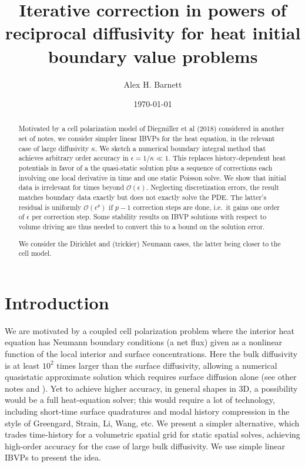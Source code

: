 \documentclass[10pt]{article}
\newcommand{\bigO}{{\mathcal O}}
\newcommand{\eps}{\epsilon}
\begin{document}
\title{Iterative correction in powers of reciprocal diffusivity for heat initial boundary value problems}

\author{Alex H. Barnett}
\date{\today}
\maketitle

\begin{abstract}
  Motivated by a cell polarization model of Diegmiller et al (2018)
  considered in another set of notes,
  we consider simpler linear IBVPs for the heat equation,
  in the relevant case of large diffusivity $\kappa$.
  We sketch a numerical boundary integral method that achieves
  arbitrary order accuracy in $\eps = 1/\kappa \ll 1$.
  This replaces history-dependent heat potentials in favor of a
  the quasi-static solution plus a sequence of corrections each involving
  one local derivative in time and one static Poisson solve.
  We show that initial data is irrelevant for times beyond $\bigO(\eps)$.
  Neglecting discretization errors, the 
  result matches boundary data exactly but does not exactly solve the PDE.
  The latter's residual is uniformly $\bigO(\eps^p)$
  if $p-1$ correction steps are done, i.e.\ it gains one order of $\eps$
  per correction step.
  Some stability results on IBVP solutions with respect to volume driving
  are thus needed to convert this to a bound on the solution error.

  We consider the Dirichlet and (trickier) Neumann cases,
  the latter being closer to the cell model.
\end{abstract}

\section{Introduction}

We are motivated by a coupled cell polarization problem \cite{diegmiller18}
where the interior heat equation has Neumann boundary conditions
(a net flux) given as a nonlinear function of the local interior and surface concentrations.
Here the bulk diffusivity is at least $10^2$ times larger than the surface diffusivity, allowing a
numerical quasistatic approximate solution which
requires surface diffusion alone (see other notes and \cite{diegmiller18}).
Yet to achieve higher accuracy, in general shapes in 3D,
a possibility would be a full heat-equation solver; this would require
a lot of technology, including short-time surface quadratures and modal history compression in the style of Greengard, Strain, Li, Wang, etc.
We present a simpler alternative, which trades time-history for
a volumetric spatial grid for static spatial solves, achieving high-order
accuracy for the case of large bulk diffusivity.
We use simple linear IBVPs to present the idea.
\end{document}
